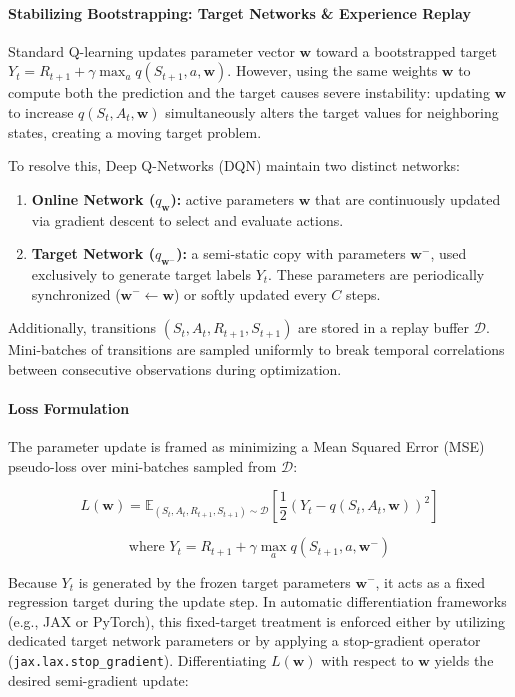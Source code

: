 \paragraph{Stabilizing Bootstrapping: Target Networks \& Experience Replay}
Standard Q-learning updates parameter vector $\mathbf{w}$ toward a bootstrapped target $Y_t = R_{t+1} + \gamma \max_{a} q(S_{t+1}, a, \mathbf{w})$. However, using the same weights $\mathbf{w}$ to compute both the prediction and the target causes severe instability: updating $\mathbf{w}$ to increase $q(S_t, A_t, \mathbf{w})$ simultaneously alters the target values for neighboring states, creating a moving target problem.

To resolve this, Deep Q-Networks (DQN) maintain two distinct networks:
\begin{enumerate}
    \item \textbf{Online Network ($q_\mathbf{w}$):} active parameters $\mathbf{w}$ that are continuously updated via gradient descent to select and evaluate actions.
    \item \textbf{Target Network ($q_{\mathbf{w}^-}$):} a semi-static copy with parameters $\mathbf{w}^-$, used exclusively to generate target labels $Y_t$. These parameters are periodically synchronized ($\mathbf{w}^- \leftarrow \mathbf{w}$) or softly updated every $C$ steps.
\end{enumerate}

Additionally, transitions $(S_t, A_t, R_{t+1}, S_{t+1})$ are stored in a replay buffer $\mathcal{D}$. Mini-batches of transitions are sampled uniformly to break temporal correlations between consecutive observations during optimization.

\paragraph{Loss Formulation}
The parameter update is framed as minimizing a Mean Squared Error (MSE) pseudo-loss over mini-batches sampled from $\mathcal{D}$:

$$L(\mathbf{w}) = \mathbb{E}_{(S_t, A_t, R_{t+1}, S_{t+1}) \sim \mathcal{D}} \left[ \frac{1}{2} \left( Y_t - q(S_t, A_t, \mathbf{w}) \right)^2 \right]$$

$$\text{where } Y_t = R_{t+1} + \gamma \max_{a} q\left(S_{t+1}, a, \mathbf{w}^-\right)$$

Because $Y_t$ is generated by the frozen target parameters $\mathbf{w}^-$, it acts as a fixed regression target during the update step. In automatic differentiation frameworks (e.g., JAX or PyTorch), this fixed-target treatment is enforced either by utilizing dedicated target network parameters or by applying a stop-gradient operator (\texttt{jax.lax.stop\_gradient}). Differentiating $L(\mathbf{w})$ with respect to $\mathbf{w}$ yields the desired semi-gradient update:

